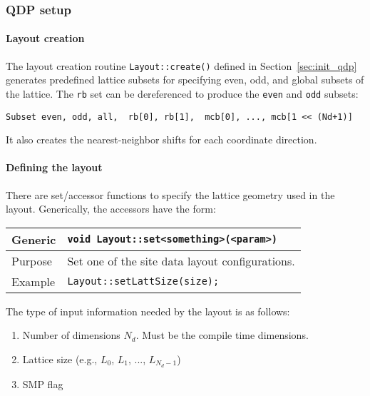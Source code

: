 \documentclass[12pt,letterpaper]{article}
\begin{document}
\subsubsection{QDP setup}

\paragraph{Layout creation}
\mbox{}

\noindent
The layout creation routine \verb|Layout::create()| defined in
Section~\ref{sec:init_qdp} generates predefined lattice subsets for
specifying even, odd, and global subsets of the lattice. The \verb|rb|
set can be dereferenced to produce the \verb|even| and \verb|odd| subsets:
%
\begin{verbatim}
Subset even, odd, all,  rb[0], rb[1],  mcb[0], ..., mcb[1 << (Nd+1)]
\end{verbatim}
%
It also creates the nearest-neighbor shifts for each coordinate
direction.

\paragraph{Defining the layout}
\mbox{}

\noindent
There are set/accessor functions to specify the lattice geometry used
in the layout. Generically, the accessors have the form:

\begin{flushleft}
  \begin{tabular}{|l|l|}
  \hline
  Generic      & \verb|void Layout::set<something>(<param>)|\\
  \hline
  Purpose      & Set one of the site data layout configurations. \\
\hline
  Example  & \verb|Layout::setLattSize(size);| \\
   \hline
 \end{tabular}
\end{flushleft}

The type of input information needed by the layout is as follows:
\begin{enumerate}
\item	Number of dimensions $N_d$. Must be the compile time dimensions.
\item	Lattice size  (e.g., $L_0$, $L_1$, ..., $L_{N_d-1}$)
\item	SMP flag
\end{enumerate}
\end{document}
